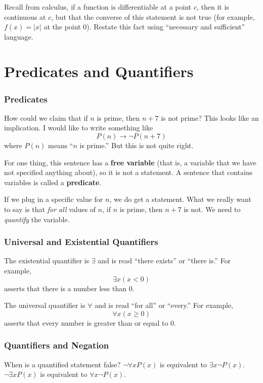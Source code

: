 \documentclass[11pt, compress]{beamer}
\newcommand{\lt}{<}
\newcommand{\terminology}[1]{\textbf{#1}}
\newcommand{\imp}{\rightarrow}
\begin{document}
\begin{frame}
\frametitle{}
\begin{example}[0.2.9]Recall from calculus, if a function is differentiable at a point \(c\), then it is continuous at \(c\), but that the converse of this statement is not true (for example, \(f(x) = |x|\) at the point 0). Restate this fact using ``necessary and sufficient'' language.
\end{example}
\end{frame}
 


\section{Predicates and Quantifiers}
\begin{frame}
\frametitle{Predicates}
  How could we claim that if \(n\) is prime, then \(n+7\) is not prime? This looks like an implication. I would like to write something like%
\begin{equation*}
P(n) \imp \neg P(n+7)
\end{equation*}
where \(P(n)\) means ``\(n\) is prime.'' But this is not quite right.
 
\pause \vfill 

For one thing, this sentence has a \terminology{free variable} (that is, a variable that we have not specified anything about), so it is not a statement.  A sentence that contains variables is called a \terminology{predicate}.
 
\pause \vfill 

If we plug in a specific value for \(n\), we do get a statement. What we really want to say is that \emph{for all} values of \(n\), if \(n\) is prime, then \(n+7\) is not. We need to \emph{quantify} the variable.
\end{frame}
 
\begin{frame}
\frametitle{Universal and Existential Quantifiers}
 The existential quantifier is \(\exists\) and is read ``there exists'' or ``there is.'' For example,%
\begin{equation*}
\exists x (x \lt 0)
\end{equation*}
asserts that there is a number less than 0.
 
\pause \vfill 

The universal quantifier is \(\forall\) and is read ``for all'' or ``every.'' For example,%
\begin{equation*}
\forall x (x \ge 0)
\end{equation*}
asserts that every number is greater than or equal to 0.
\end{frame}
 
\begin{frame}
\frametitle{Quantifiers and Negation}
 When is a quantified statement false?
 \(\neg \forall x P(x)\) is equivalent to \(\exists x \neg P(x)\).
 \(\neg \exists x P(x)\) is equivalent to \(\forall x \neg P(x)\).
\end{frame}
 
\end{document}
